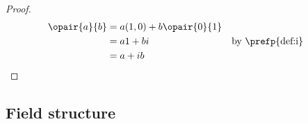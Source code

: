 \begin{theorem}
\end{theorem}
\begin{proof}
\begin{align*}
  \opair{a}{b}
    &= a(1,0) + b\opair{0}{1}
  \\&= a1 + bi
    && \text{by \prefp{def:i}}
  \\&= a + ib
\end{align*}
\end{proof}




\subsection{Field structure}



